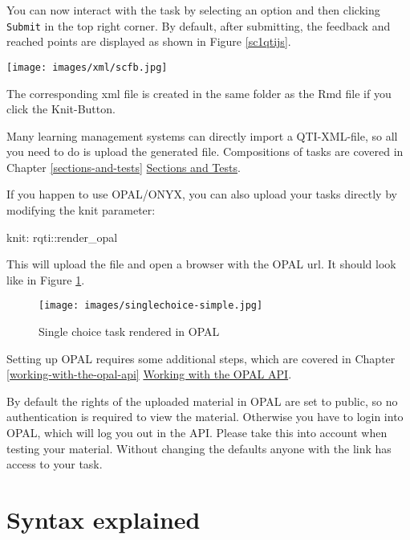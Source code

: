 \documentclass[twoside]{tufte-book}
\newenvironment{Shaded}{}{}
\newcommand{\NormalTok}[1]{#1}
\newcommand{\SpecialCharTok}[1]{\textcolor[rgb]{0.25,0.44,0.63}{#1}}
\begin{document}
You can now interact with the task by selecting an option and then clicking \texttt{Submit} in the top right corner. By default, after submitting, the feedback and reached points are displayed as shown in Figure \ref{sc1qtijs}.

\begin{figure*}
\centering
\texttt{[image: images/xml/scfb.jpg]}
\caption{\label{sc1qtijs}Preview of single choice task with feedback rendered by QTIJS}
\end{figure*}

The corresponding xml file is created in the same folder as the Rmd file if you click the Knit-Button.

Many learning management systems can directly import a QTI-XML-file, so all you need to do is upload the generated file. Compositions of tasks are covered in Chapter \ref{sections-and-tests} \href{section.html}{Sections and Tests}.

If you happen to use OPAL/ONYX, you can also upload your tasks directly by modifying the knit parameter:

\begin{Shaded}
\begin{Highlighting}[]
\NormalTok{knit}\SpecialCharTok{:}\NormalTok{ rqti}\SpecialCharTok{::}\NormalTok{render\_opal}
\end{Highlighting}
\end{Shaded}

This will upload the file and open a browser with the OPAL url. It should look like in Figure \ref{sc1opal}.

\begin{figure}
\centering
\texttt{[image: images/singlechoice-simple.jpg]}
\caption{\label{sc1opal}Single choice task rendered in OPAL}
\end{figure}

Setting up OPAL requires some additional steps, which are covered in Chapter \ref{working-with-the-opal-api} \href{api_opal.html}{Working with the OPAL API}.

By default the rights of the uploaded material in OPAL are set to public, so no authentication is required to view the material. Otherwise you have to login into OPAL, which will log you out in the API. Please take this into account when testing your material. Without changing the defaults anyone with the link has access to your task.

\section{Syntax explained}\label{syntax-explained}
\end{document}
